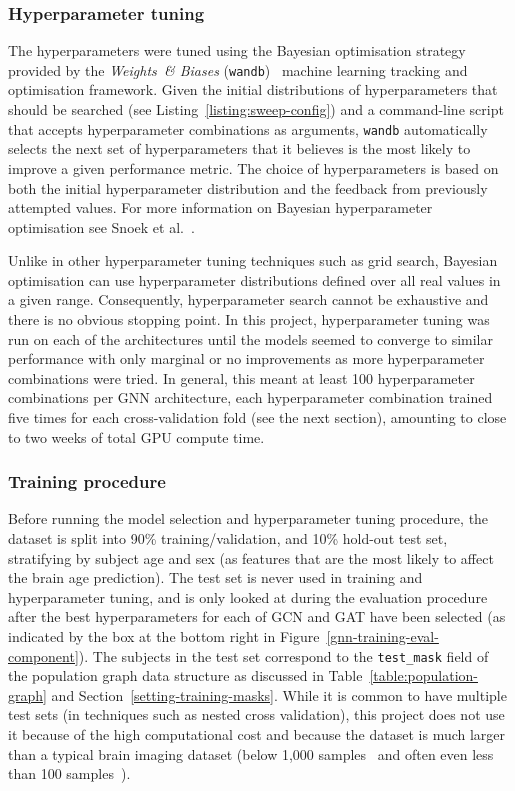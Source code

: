 \subsubsection{Hyperparameter tuning}
The hyperparameters were tuned using the Bayesian optimisation strategy provided by the \textit{Weights~\& Biases} (\texttt{wandb})~\cite{wandb} machine learning tracking and optimisation framework. Given the initial distributions of hyperparameters that should be searched (see Listing~\ref{listing:sweep-config}) and a command-line script that accepts hyperparameter combinations as arguments, \texttt{wandb} automatically selects the next set of hyperparameters that it believes is the most likely to improve a given performance metric. The choice of hyperparameters is based on both the initial hyperparameter distribution and the feedback from previously attempted values. For more information on Bayesian hyperparameter optimisation see Snoek et al.~\cite{snoek2012practical}.

Unlike in other hyperparameter tuning techniques such as grid search, Bayesian optimisation can use hyperparameter distributions defined over all real values in a given range. Consequently, hyperparameter search cannot be exhaustive and there is no obvious stopping point. In this project, hyperparameter tuning was run on each of the architectures until the models seemed to converge to similar performance with only marginal or no improvements as more hyperparameter combinations were tried. In general, this meant at least 100 hyperparameter combinations per GNN architecture, each hyperparameter combination trained five times for each cross-validation fold (see the next section), amounting to close to two weeks of total GPU compute time.

\subsubsection{Training procedure}
\label{section:training-procedure}

Before running the model selection and hyperparameter tuning procedure, the dataset is split into 90\% training/validation, and 10\% hold-out test set, stratifying by subject age and sex (as features that are the most likely to affect the brain age prediction). The test set is never used in training and hyperparameter tuning, and is only looked at during the evaluation procedure after the best hyperparameters for each of GCN and GAT have been selected (as indicated by the box at the bottom right in Figure~\ref{gnn-training-eval-component}). The subjects in the test set correspond to the \texttt{test\_mask} field of the population graph data structure as discussed in Table~\ref{table:population-graph} and Section~\ref{setting-training-masks}. While it is common to have multiple test sets (in techniques such as nested cross validation), this project does not use it because of the high computational cost and because the dataset is much larger than a typical brain imaging dataset (below 1,000 samples~\cite{parisot2018disease, cole2018brain} and often even less than 100 samples~\cite{franke2019ten}).

